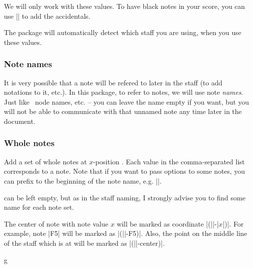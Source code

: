 We will only work with these values. To have black notes in your score, you can 
use |\tmappendaccidental| to add the accidentals.

The package will automatically detect which staff you are using, when you use 
these values.
\subsubsection{Note names}\label{sec:music-notes:commands:note-names}
It is very possible that a note will be refered to later in the staff (to add 
notations to it, etc.). In this package, to refer to notes, we will use note 
\emph{names}. Just like \tikzname\ node names, etc. -- you can leave the name 
empty if you want, but you will not be able to communicate with that unnamed note 
any time later in the document.
\subsubsection{Whole notes}\label{sec:music-notes:commands:whole}
\begin{command}{\tmwhole{}}
  Add a set of whole notes at $x$-position . Each value in the 
  comma-separated list  corresponds to a note. Note that 
  if you want to pass options to some notes, you can prefix  to the 
  beginning of the note name, e.g. ||.

   can be left empty, but as in the staff naming, I strongly advise 
  you to find some name for each note set.

  The center of note with note value $x$ will be marked as coordinate 
  |(||-|$x$|)|. For example, note |F5| will be marked as 
  |(||-F5)|. Also, the point on the middle line of the staff which is 
  at  will be marked as |(||-center)|.
\end{command}
\begin{codeexample}[]
\begin{tmline}
\begin{tmstaff}{g}{}
\end{tmstaff}
\end{tmline}
\end{codeexample}
